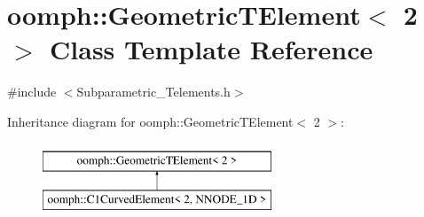 \hypertarget{classoomph_1_1GeometricTElement_3_012_01_4}{}\section{oomph\+:\+:Geometric\+T\+Element$<$ 2 $>$ Class Template Reference}
\label{classoomph_1_1GeometricTElement_3_012_01_4}


{\ttfamily \#include $<$Subparametric\+\_\+\+Telements.\+h$>$}

Inheritance diagram for oomph\+:\+:Geometric\+T\+Element$<$ 2 $>$\+:\begin{figure}[H]
\begin{center}
\leavevmode
\includegraphics[height=2.000000cm]{classoomph_1_1GeometricTElement_3_012_01_4}
\end{center}
\end{figure}
